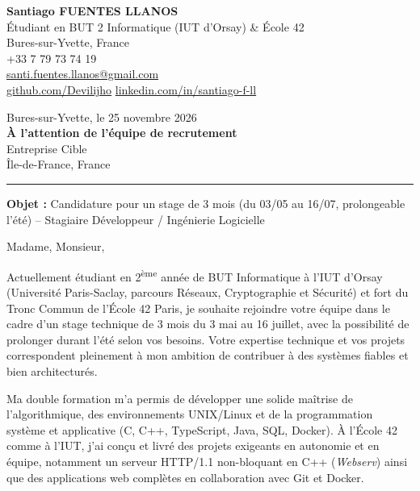 \documentclass[10.5pt,a4paper]{article}
\begin{document}
\begin{minipage}[t]{0.55\textwidth}
  {\Large\bfseries Santiago FUENTES LLANOS}\\
  Étudiant en BUT 2 Informatique (IUT d'Orsay) \& École 42\\
  Bures-sur-Yvette, France\\
  +33 7 79 73 74 19\\
  \href{mailto:santi.fuentes.llanos@gmail.com}{santi.fuentes.llanos@gmail.com}\\
  \href{https://github.com/Devilijho}{github.com/Devilijho} \textperiodcentered{} \href{https://www.linkedin.com/in/santiago-f-ll}{linkedin.com/in/santiago-f-ll}
\end{minipage}
\hfill
\begin{minipage}[t]{0.42\textwidth}
  \raggedleft
  Bures-sur-Yvette, le 25 novembre 2026\\[0.6em]
  \textbf{À l'attention de l'équipe de recrutement}\\
  Entreprise Cible\\
  Île-de-France, France
\end{minipage}

\vspace{1.2em}
\rule{\linewidth}{0.5pt}
\vspace{0.5em}

\textbf{Objet :} Candidature pour un stage de 3 mois (du 03/05 au 16/07, prolongeable l'été) -- Stagiaire Développeur / Ingénierie Logicielle

\vspace{0.5em}

Madame, Monsieur,

Actuellement étudiant en 2\textsuperscript{ème} année de BUT Informatique à l'IUT d'Orsay (Université Paris-Saclay, parcours Réseaux, Cryptographie et Sécurité) et fort du Tronc Commun de l'École 42 Paris, je souhaite rejoindre votre équipe dans le cadre d'un stage technique de 3 mois du 3 mai au 16 juillet, avec la possibilité de prolonger durant l'été selon vos besoins. Votre expertise technique et vos projets correspondent pleinement à mon ambition de contribuer à des systèmes fiables et bien architecturés.

Ma double formation m'a permis de développer une solide maîtrise de l'algorithmique, des environnements UNIX/Linux et de la programmation système et applicative (C, C++, TypeScript, Java, SQL, Docker). À l'École 42 comme à l'IUT, j'ai conçu et livré des projets exigeants en autonomie et en équipe, notamment un serveur HTTP/1.1 non-bloquant en C++ (\textit{Webserv}) ainsi que des applications web complètes en collaboration avec Git et Docker.
\end{document}
